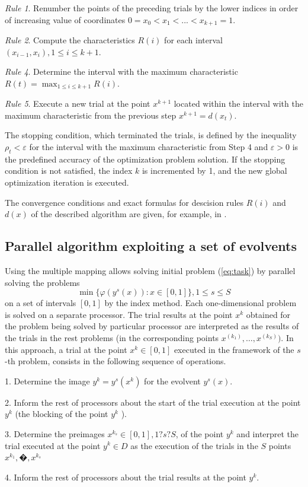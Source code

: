 \documentclass[runningheads]{llncs}
\begin{document}
\textit{Rule 1}. Renumber the points of the preceding trials by the lower indices in order of
increasing value of coordinates
$0=x_0<x_1<...<x_{k+1}=1$.

\textit{Rule 2}. Compute the characteristics \(R(i)\) for each interval \((x_{i-1},x_i),1\leq i\leq
k+1\).

\textit{Rule 4}. Determine the interval with the maximum characteristic $R(t)=\max_{1\leq i
\leq k+1}R(i)$.

\textit{Rule 5}. Execute a new trial at the point \(x^{k+1}\) located within the interval with the
maximum characteristic from the previous step
  $x^{k+1}=d(x_t)$.

The stopping condition, which terminated the trials, is defined by the inequality
$\rho_t<\varepsilon$
for the interval with the maximum characteristic from Step 4 and \(\varepsilon >0\) is the
predefined
accuracy of the optimization problem solution. If the stopping condition is not satisfied,
the index \(k\) is incremented by 1, and the new global optimization iteration is executed.

The convergence conditions and exact formulas for descision rules $R(i)$ and $d(x)$ of the
described algorithm are given, for example, in \cite{strSergGO}.

\subsection{Parallel algorithm exploiting a set of evolvents}
\label{sec:parallel_evolvents}
Using the multiple mapping allows solving initial problem (\ref{eq:task}) by parallel solving the
problems
\[
\min\{\varphi(y^s(x)):x\in [0,1]\}, 1\leqslant s\leqslant S
\]
on a set of intervals $[0,1]$ by the index method. Each one-dimensional problem is solved on a
separate processor. The trial results at the point \(x^k\) obtained for the problem being solved by
particular processor are interpreted as the results of the trials in the rest problems (in the
corresponding points \(x^(k_1 ),\dots,x^(k_S))\). In this approach, a trial at the point \(x^k \in
[0,1]\) executed in the framework of the \(s\)-th problem, consists in the following sequence of
operations.
\par
1. Determine the image \(y^k=y^s (x^k)\) for the evolvent \(y^s (x)\).
\par
2. Inform the rest of processors about the start of the trial execution at the point\( y^k\) (the
blocking of the point \(y^k\) ).
\par
3. Determine the preimages \(x{}^{k_s}  \in [0,1], 1?s?S\), of the point \(y^k\) and interpret the
trial executed at the point \(y^k \in D \) as the execution of the trials in the \(S\) points
\(x{}^{k_1} ,�,x{}^{k_s} \)
\par
4. Inform the rest of processors about the trial results at the point \(y^k\).
\par
\end{document}
